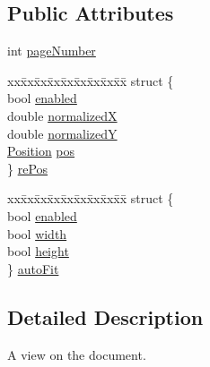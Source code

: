 \subsection*{Public Attributes}
\begin{DoxyCompactItemize}
\item 
int \hyperlink{classOkular_1_1DocumentViewport_a122674d4a493e79b1aa5fd5c00e81c93}{page\+Number}
\item 
\begin{tabbing}
xx\=xx\=xx\=xx\=xx\=xx\=xx\=xx\=xx\=\kill
struct \{\\
\>bool \hyperlink{classOkular_1_1DocumentViewport_a6dddb31dbc72d7fb3efe094d840d8692}{enabled}\\
\>double \hyperlink{classOkular_1_1DocumentViewport_a2f749d09360cca2f64af1a893a190e2f}{normalizedX}\\
\>double \hyperlink{classOkular_1_1DocumentViewport_aa86271c42d62ef102c6ba570bf40e770}{normalizedY}\\
\>\hyperlink{classOkular_1_1DocumentViewport_aad7228ed215e5a676cf50dabd4e41552}{Position} \hyperlink{classOkular_1_1DocumentViewport_a013c8cd543d57045791fe054da340a0e}{pos}\\
\} \hyperlink{classOkular_1_1DocumentViewport_a054f24bcba44b795a3671ac53693ff45}{rePos}\\

\end{tabbing}\item 
\begin{tabbing}
xx\=xx\=xx\=xx\=xx\=xx\=xx\=xx\=xx\=\kill
struct \{\\
\>bool \hyperlink{classOkular_1_1DocumentViewport_a6dddb31dbc72d7fb3efe094d840d8692}{enabled}\\
\>bool \hyperlink{classOkular_1_1DocumentViewport_a3cff94312e391a1b0b786a718ea72356}{width}\\
\>bool \hyperlink{classOkular_1_1DocumentViewport_a1deb8db38c11ca9c5239261be374ab8a}{height}\\
\} \hyperlink{classOkular_1_1DocumentViewport_a5acbe494c97c15ae7937003474a78a40}{autoFit}\\

\end{tabbing}\end{DoxyCompactItemize}


\subsection{Detailed Description}
A view on the document. 


